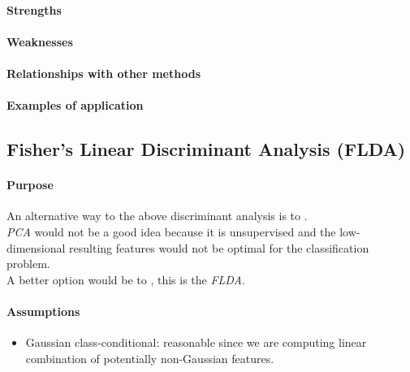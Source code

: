 \paragraph{Strengths}
\paragraph{Weaknesses}
\paragraph{Relationships with other methods}
\paragraph{Examples of application}

\subsection{Fisher's Linear Discriminant Analysis (FLDA)}
\paragraph{Purpose}
An alternative way to the above discriminant analysis is to .\\
\emph{PCA} would not be a good idea because it is unsupervised and the low-dimensional
resulting features would not be optimal for the classification problem.\\
A better option would be to , this is the \emph{FLDA}.
\paragraph{Assumptions}
\begin{itemize}
    \item Gaussian class-conditional: reasonable since we are computing linear 
        combination of potentially non-Gaussian features.
\end{itemize}


